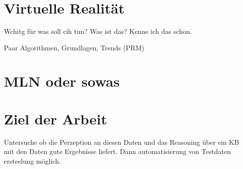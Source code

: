 \section{Virtuelle Realität}

Wchitg für was soll cih tun? Was ist das? Kenne ich das schon.

Paar Algorithmen, Grundlagen, Trends (PRM) 

\section{MLN oder sowas}

\section{Ziel der Arbeit}
\label{sec:goal}


Untersuche ob die Perzeption an diesen Daten und das Reasoning über ein KB mit den Daten gute Ergebnisse liefert. Dann automatisierung von Testdaten ersteelung möglich. 